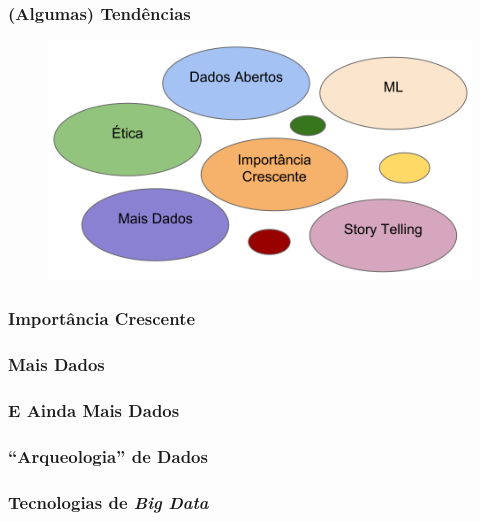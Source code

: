 \documentclass[hyperref={pdfpagelabels=true}]{beamer}
\begin{document}
\begin{frame}
\frametitle{(Algumas) Tend\^{e}ncias}

    \begin{figure}   
         \includegraphics[width=\textwidth]{trends.png}   
    \end{figure}     

\end{frame}




\begin{frame}
\frametitle{Import\^{a}ncia Crescente}


\end{frame}

\begin{frame}
\frametitle{Mais Dados}


\end{frame}

\begin{frame}
\frametitle{E Ainda Mais Dados}


\end{frame}

\begin{frame}
\frametitle{``Arqueologia'' de Dados}


\end{frame}


\begin{frame}
\frametitle{Tecnologias de \textit{Big Data}}


\end{frame}
\end{document}
